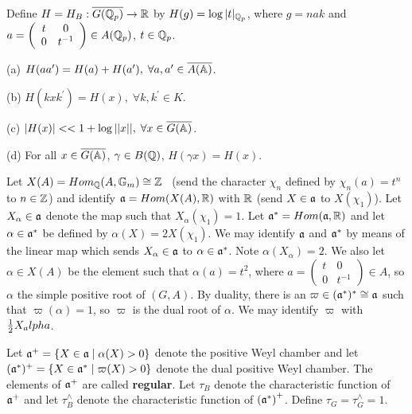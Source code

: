 Define $H=H_B:\overline{G({\Bbb{Q}}_p)}\rightarrow \Bbb{R}$
by $H(g)=\log |t|_{{\Bbb{Q}}_p}$, where $g=nak$ and $a=\left( 
\begin{array}{cc}
t & 0 \\ 
0 & t^{-1}
\end{array}
\right) \in A({\Bbb{Q}}_p)$, $t\in {\Bbb{Q}}_p$.

\begin{lemma}
(a) $H(aa^{\prime })=H(a)+H(a^{\prime }),
\;\forall a,a^{\prime }\in \overline{A({\Bbb{A}})}$.

(b) $H(kxk^{\prime })=H(x),\;\forall k,k^{\prime }\in K$.

(c) $|H(x)|<<1+\log ||x||,\;\forall x\in \overline{G({\Bbb{A}})}$.

(d) For all $x\in \overline{G({\Bbb{A}})}$,
$\gamma \in B({\Bbb{Q}})$, $H(\gamma x)=H(x)$.
\end{lemma}

Let $X(A)=Hom_{{\Bbb{Q}}}(A,{\Bbb{G}}_m)\cong {\Bbb{Z}}$ \
(send the character $\chi _n$ defined by $\chi _n(a)=t^n$
to $n\in {\Bbb{Z}}$) and identify ${{\frak{a}}}=Hom(X(A),\Bbb{R})$
with $\Bbb{R}$ (send $X\in {\frak{a}}$ to $X(\chi _1)$).
Let $X_\alpha\in {\frak{a}}$ denote the map such that
$X_\alpha (\chi_1)=1$.
Let ${\frak{a}}^{*}=Hom({\frak{a}},\Bbb{R})$ and let $\alpha \in {\frak{a}}^{*}$
be defined by $\alpha (X)=2X(\chi _1)$.
We may identify ${\frak{a}}$ and ${\frak{a}}^*$ by means of the
linear map which sends
$X_\alpha\in {\frak{a}}$ to $\alpha\in {\frak{a}}^*$.
Note $\alpha(X_\alpha )=2$.
We also let $\alpha \in X(A)$ be the
element such that $\alpha (a)=t^2$, where $a=\left( 
\begin{array}{cc}
t & 0 \\ 
0 & t^{-1}
\end{array}
\right) \in A$, so $\alpha $ the simple positive root of $(G,A)$. By
duality, there is an $\varpi \in ({\frak{a}}^{*})^{*}\cong {\frak{a}}$
such that 
$\varpi (\alpha )=1$, so $\varpi $ is the dual root of $\alpha $. We
may identify $\varpi$ with ${1\over 2}X_alpha$.

Let ${\frak{a}}^{+}=\{X\in {\frak{a}}\;|\;\alpha (X)>0\}$
denote the positive
Weyl chamber and let
$({\frak{a}}^{*})^{+}=\{X\in {\frak{a}}^{*}\;|\;\varpi (X)>0\}$
denote the dual positive Weyl chamber. The elements of
${\frak{a}}^{+} $ are called \textbf{regular}. Let $\tau _B$ denote
the characteristic
function of ${\frak{a}}^{+}$ and let $\tau _B^{\wedge }$ denote the
characteristic function of $({\frak{a}}^{*}\frak{)}^{+}$.
Define $\tau _G=\tau _G^{\wedge }=1$.

